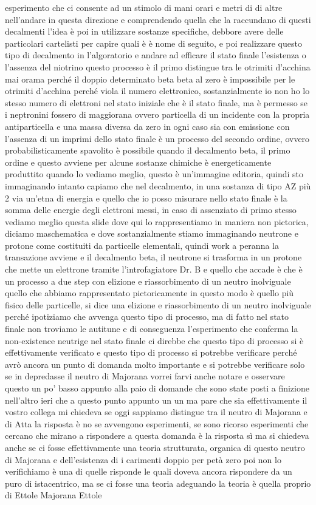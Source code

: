 esperimento che ci consente ad un stimolo di mani orari e metri di di altre nell'andare in questa direzione e comprendendo quella che la raccundano di questi decalmenti l'idea è poi in utilizzare sostanze specifiche, debbore avere delle particolari cartelisti per capire quali è è nome di seguito, e poi realizzare questo tipo di decalmento in l'algoratorio e andare ad efficare il stato finale l'esistenza o l'assenza del niotrino questo processo è il primo distingue tra le otrimiti d'acchina mai orama perché il doppio determinato beta beta al zero è impossibile per le otrimiti d'acchina perché viola il numero elettronico, sostanzialmente io non ho lo stesso numero di elettroni nel stato iniziale che è il stato finale, ma è permesso se i neptronini fossero di maggiorana ovvero particella di un incidente con la propria antiparticella e una massa diversa da zero in ogni caso sia con emissione con l'assenza di un imprimi dello stato finale è un processo del secondo ordine, ovvero probabilisticamente spavolito è possibile quando il decalmento beta, il primo ordine e questo avviene per alcune sostanze chimiche è energeticamente produttito quando lo vediamo meglio, questo è un'immagine editoria, quindi sto immaginando intanto capiamo che nel decalmento, in una sostanza di tipo AZ più 2 via un'etna di energia e quello che io posso misurare nello stato finale è la somma delle energie degli elettroni messi, in caso di assenziato di primo stesso vediamo meglio questa slide dove qui lo rappresentiamo in maniera non pictorica, diciamo maschematica e dove sostanzialmente stiamo immaginando neutrone e protone come costituiti da particelle elementali, quindi work a peranna la transazione avviene e il decalmento beta, il neutrone si trasforma in un protone che mette un elettrone tramite l'introfagiatore Dr. B e quello che accade è che è un processo a due step con elizione e riassorbimento di un neutro inolviguale quello che abbiamo rappresentato pictoricamente in questo modo è quello più fisico delle particelle, si dice una elizione e riassorbimento di un neutro inolviguale perché ipotiziamo che avvenga questo tipo di processo, ma di fatto nel stato finale non troviamo le autitune e di conseguenza l'esperimento che conferma la non-existence neutrige nel stato finale ci direbbe che questo tipo di processo si è effettivamente verificato e questo tipo di processo si potrebbe verificare perché avrò ancora un punto di domanda molto importante e si potrebbe verificare solo se in depredasse il neutro di Majorana vorrei farvi anche notare e osservare questo un po' basso appunto alla paio di domande che sono state posti a finizione nell'altro ieri che a questo punto appunto un un ma pare che sia effettivamente il vostro collega mi chiedeva se oggi sappiamo distingue tra il neutro di Majorana e di Atta la risposta è no se avvengono esperimenti, se sono ricorso esperimenti che cercano che mirano a rispondere a questa domanda è la risposta sì ma si chiedeva anche se ci fosse effettivamente una teoria strutturata, organica di questo neutro di Majorana e dell'esistenza di i carimenti doppio per petà zero poi non lo verifichiamo è una di quelle risponde le quali doveva ancora rispondere da un puro di istacentrico, ma se ci fosse una teoria adeguando la teoria è quella proprio di Ettole Majorana Ettole 